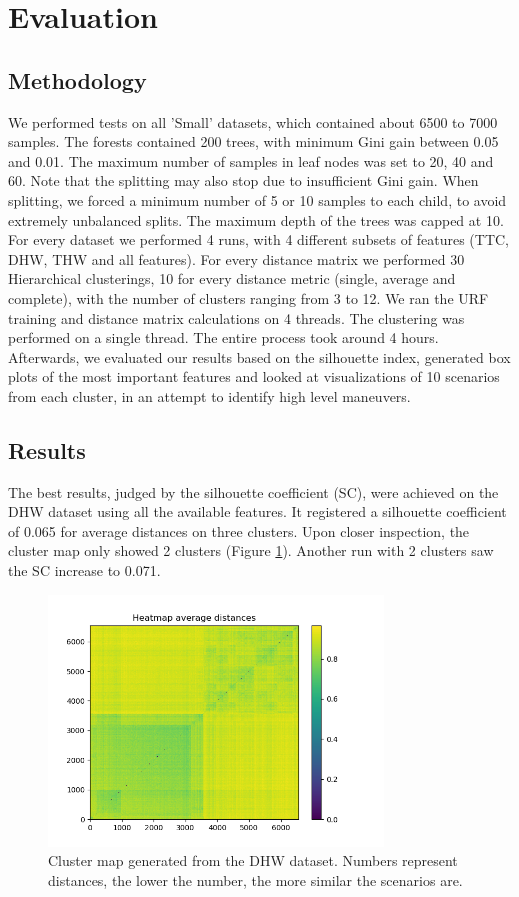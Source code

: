 \documentclass[conference]{IEEEtran}
\begin{document}
\section{Evaluation}
\label{section:evaluation}
\subsection{Methodology}
We performed tests on all 'Small' datasets, which contained about 6500 to 7000 samples. The forests contained 200 trees, with minimum Gini gain between 0.05 and 0.01. The maximum number of samples in leaf nodes was set to 20, 40 and 60. Note that the splitting may also stop due to insufficient Gini gain. When splitting, we forced a minimum number of 5 or 10 samples to each child, to avoid extremely unbalanced splits. The maximum depth of the trees was capped at 10. For every dataset we performed 4 runs, with 4 different subsets of features (TTC, DHW, THW and all features). For every distance matrix we performed 30 Hierarchical clusterings, 10 for every distance metric (single, average and complete), with the number of clusters ranging from 3 to 12. We ran the URF training and distance matrix calculations on 4 threads. The clustering was performed on a single thread. The entire process took around 4 hours. Afterwards, we evaluated our results based on the silhouette index, generated box plots of the most important features and looked at visualizations of 10 scenarios from each cluster, in an attempt to identify high level maneuvers.

\subsection{Results}
The best results, judged by the silhouette coefficient (SC), were achieved on the DHW dataset using all the available features. It registered a silhouette coefficient of 0.065 for average distances on three clusters. Upon closer inspection, the cluster map only showed 2 clusters (Figure \ref{map-dhw}). Another run with 2 clusters saw the SC increase to 0.071.

\begin{figure}[!h]
  \centering
  \includegraphics[width=3.5in]{./images/heatmap_dhw_all_2_avg}
  \caption{Cluster map generated from the DHW dataset. Numbers represent distances, the lower the number, the more similar the scenarios are.}
  \label{map-dhw}
\end{figure}
\end{document}
